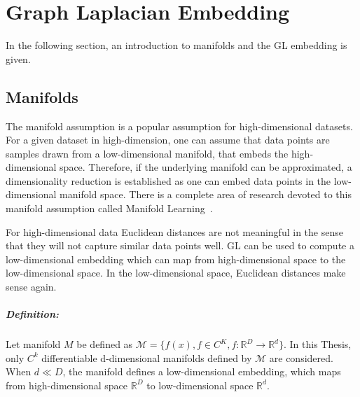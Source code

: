 \chapter{Graph Laplacian Embedding}
In the following section, an introduction to manifolds and the GL embedding is given.

\section{Manifolds}
\label{sec:manifolds}


The manifold assumption is a popular assumption for high-dimensional datasets.
For a given dataset in high-dimension, one can assume that data points are samples drawn from a low-dimensional manifold,
that embeds the high-dimensional space. 
Therefore, if the underlying manifold can be approximated, a dimensionality reduction
is established as one can embed data points in the low-dimensional manifold space.
There is a complete area of research devoted to this manifold assumption called Manifold Learning~\cite{ManifoldLearning}.

For high-dimensional data Euclidean distances are not meaningful in the sense that they will not capture similar data points well. 
GL can be used to compute a low-dimensional embedding which can map from high-dimensional space to the low-dimensional space.
In the low-dimensional space, Euclidean distances make sense again. 


\paragraph{Definition:}
Let manifold $M$ be defined as $\mathcal{M} = \{ f(x), f \in C^K, f: \mathbb{R}^D \to \mathbb{R}^d \}$.
In this Thesis, only $C^k$ differentiable d-dimensional manifolds defined by $\mathcal{M}$ are considered. 
When $d \ll D$, the manifold defines a low-dimensional embedding, which maps from high-dimensional space 
$\mathbb{R}^D$ to low-dimensional space $\mathbb{R}^d$.

